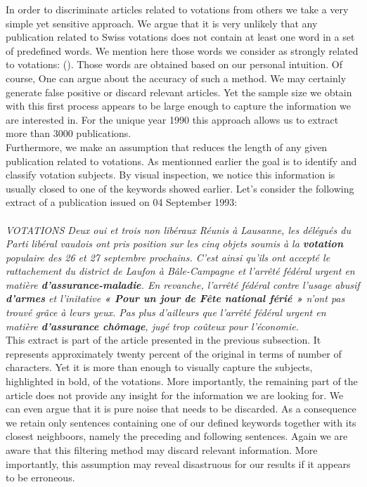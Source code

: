 \documentclass[11pt]{article}
\begin{document}
In order to discriminate articles related to votations from others we take a very simple yet sensitive approach. We argue that it is very unlikely that any publication related to Swiss votations does not contain at least one word in a set of predefined words. We mention here those words we consider as strongly related to votations: (). Those words are obtained based on our personal intuition. Of course, One can argue about the accuracy of such a method. We may certainly generate false positive or discard relevant articles. Yet the sample size we obtain with this first process appears to be large enough to capture the information we are interested in. For the unique year 1990 this approach allows us to extract more than 3000 publications.
\\
Furthermore, we make an assumption that reduces the length of any given publication related to votations. As mentionned earlier the goal is to identify and classify votation subjects. By visual inspection, we notice this information is usually closed to one of the keywords showed earlier. 
Let's consider the following extract of a publication issued on 04 September 1993:\\
\\
\textit{VOTATIONS Deux oui et trois non libéraux Réunis à Lausanne, les délégués du Parti libéral vaudois ont pris position sur les cinq objets soumis à la \textbf{votation} populaire des 26 et 27 septembre prochains. C'est ainsi qu'ils ont accepté le rattachement du district de Laufon à Bâle-Campagne et l'arrêté fédéral urgent en matière \textbf{d'assurance-maladie}. En revanche, l'arrêté fédéral contre l'usage abusif \textbf{d'armes} et l'initative \textbf{« Pour un jour de Fête national férié »} n'ont pas trouvé grâce à leurs yeux. Pas plus d'ailleurs que l'arrêté fédéral urgent en matière \textbf{d'assurance chômage}, jugé trop coûteux pour l'économie.}\\

This extract is part of the article presented in the previous subsection. It represents approximately twenty percent of the original in terms of number of characters. Yet it is more than enough to visually capture the subjects, highlighted in bold, of the votations. More importantly, the remaining part of the article does not provide any insight for the information we are looking for. We can even argue that it is pure noise that needs to be discarded. As a consequence we retain only sentences containing one of our defined keywords together with its closest neighboors, namely the preceding and following sentences. Again we are aware that this filtering method may discard relevant information. More importantly, this assumption may reveal disastruous for our results if it appears to be erroneous.
\end{document}

